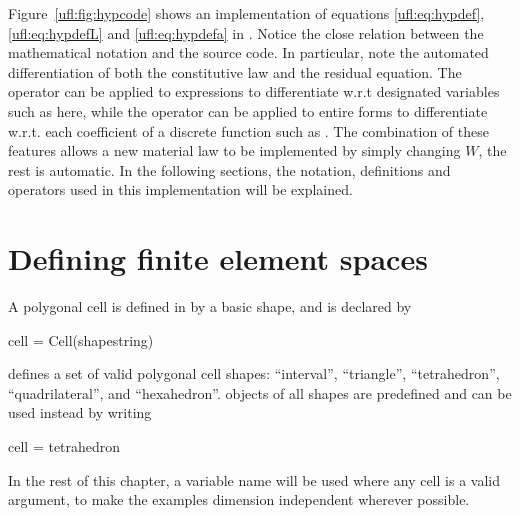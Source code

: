 

Figure~\ref{ufl:fig:hypcode} shows an implementation of
equations \eqref{ufl:eq:hypdef}, \eqref{ufl:eq:hypdefL} and \eqref{ufl:eq:hypdefa}
in \ufl{}.  Notice the close relation between the
mathematical notation and the \ufl{} source code. In particular, note
the automated differentiation of both the constitutive law and the
residual equation. The operator  can be applied to
expressions to differentiate w.r.t designated variables such as
 here, while the operator  can be applied
to entire forms to differentiate w.r.t. each coefficient of a discrete
function such as .  The combination of these features allows
a new material law to be implemented by simply changing $W$, the rest
is automatic.  In the following sections, the notation, definitions
and operators used in this implementation will be explained.

\section{Defining finite element spaces} \label{ufl:sec:elements}
A polygonal cell is defined in \ufl{} by a basic shape, and is declared by
\begin{python}
cell = Cell(shapestring)
\end{python}
\ufl{} defines a set of valid polygonal cell shapes: ``interval'',
``triangle'', ``tetrahedron'', ``quadrilateral'', and ``hexahedron''.
 objects of all shapes are predefined and can be used
instead by writing
\begin{python}
cell = tetrahedron
\end{python}
In the rest of this chapter, a variable name  will be used
where any cell is a valid argument, to make the examples dimension
independent wherever possible.

